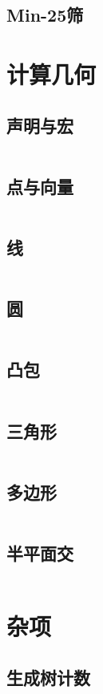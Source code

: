 \documentclass[10pt, a4paper, oneside]{ctexart}
\begin{document}
\begin{multicols}{2}
        \subsection{Min-25筛}
        

        \section{计算几何}
        \subsection{声明与宏}
        \inputminted{cpp}{src/geometry/define.cpp}
        \subsection{点与向量}
        \inputminted{cpp}{src/geometry/vector.cpp}
        \subsection{线}
        \inputminted{cpp}{src/geometry/line.cpp}
        \subsection{圆}
        \inputminted{cpp}{src/geometry/circle.cpp}
        \subsection{凸包}
        \inputminted{cpp}{src/geometry/convex.cpp}
        \subsection{三角形}
        \inputminted{cpp}{src/geometry/triangle.cpp}
        \subsection{多边形}
        \inputminted{cpp}{src/geometry/polygon.cpp}
        \subsection{半平面交}
        \inputminted{cpp}{src/geometry/half-plane.cpp}

        \section{杂项}
        \subsection{生成树计数}
        

\end{multicols}
\end{document}
